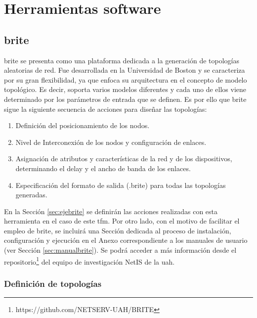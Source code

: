 \section{Herramientas software}
\label{sec:software}

\subsection{\acrshort{brite}}
\label{sec:brite}

\gls{brite} \cite{brite} se presenta como una plataforma dedicada a la generación de topologías aleatorias de red. Fue desarrollada en la Universidad de Boston y se caracteriza por su gran flexibilidad, ya que enfoca su arquitectura en el concepto de modelo topológico. Es decir, soporta varios modelos diferentes y cada uno de ellos viene determinado por los parámetros de entrada que se definen. Es por ello que \gls{brite} sigue la siguiente secuencia de acciones para diseñar las topologías:

\vspace{3mm}

\begin{enumerate}
    \item Definición del posicionamiento de los nodos.
    \item Nivel de Interconexión de los nodos y configuración de enlaces.
    \item Asignación de atributos y características de la red y de los dispositivos, determinando el delay y el ancho de banda de los enlaces.
    \item Especificación del formato de salida (.brite) para todas las topologías generadas.
\end{enumerate}

\vspace{3mm}

En la Sección \ref{sec:ejebrite} se definirán las acciones realizadas con esta herramienta en el caso de este \gls{tfm}. Por otro lado, con el motivo de facilitar el empleo de \gls{brite}, se incluirá una Sección dedicada al proceso de instalación, configuración y ejecución en el Anexo correspondiente a los manuales de usuario (ver Sección \ref{sec:manualbrite}). Se podrá acceder a más información desde el repositorio\footnote{https://github.com/NETSERV-UAH/BRITE} del equipo de investigación NetIS de la \gls{uah}.

\subsubsection{Definición de topologías}
\label{sec:param}

